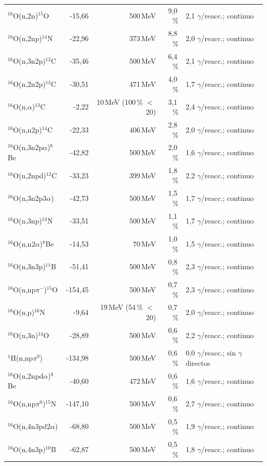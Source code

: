 \documentclass[11pt,a4paper]{article}
\begin{document}
{\begin{longtable}{p{4.4cm}rrrp{4.6cm}}
$^{16}$O(n,2n)$^{15}$O & -15,66 & 500\,MeV & 9,0\,\% & 2,1 $\gamma$/reacc.; continuo \\
$^{16}$O(n,2np)$^{14}$N & -22,96 & 373\,MeV & 8,8\,\% & 2,0 $\gamma$/reacc.; continuo \\
$^{16}$O(n,3n2p)$^{12}$C & -35,46 & 500\,MeV & 6,4\,\% & 2,1 $\gamma$/reacc.; continuo \\
$^{16}$O(n,2n2p)$^{13}$C & -30,51 & 471\,MeV & 4,0\,\% & 1,7 $\gamma$/reacc.; continuo \\
$^{16}$O(n,$\alpha$)$^{13}$C & -2,22 & 10\,MeV (100\,\% $<$\,20) & 3,1\,\% & 2,4 $\gamma$/reacc.; continuo \\
$^{16}$O(n,n2p)$^{14}$C & -22,33 & 406\,MeV & 2,8\,\% & 2,0 $\gamma$/reacc.; continuo \\
$^{16}$O(n,3n2p$\alpha$)$^{8}$Be & -42,82 & 500\,MeV & 2,0\,\% & 1,6 $\gamma$/reacc.; continuo \\
$^{16}$O(n,2npd)$^{12}$C & -33,23 & 399\,MeV & 1,8\,\% & 2,2 $\gamma$/reacc.; continuo \\
$^{16}$O(n,3n2p3$\alpha$) & -42,73 & 500\,MeV & 1,5\,\% & 1,7 $\gamma$/reacc.; continuo \\
$^{16}$O(n,3np)$^{13}$N & -33,51 & 500\,MeV & 1,1\,\% & 1,7 $\gamma$/reacc.; continuo \\
$^{16}$O(n,n2$\alpha$)$^{8}$Be & -14,53 & 70\,MeV & 1,0\,\% & 1,5 $\gamma$/reacc.; continuo \\
$^{16}$O(n,3n3p)$^{11}$B & -51,41 & 500\,MeV & 0,8\,\% & 2,3 $\gamma$/reacc.; continuo \\
$^{16}$O(n,np$\pi^-$)$^{15}$O & -154,45 & 500\,MeV & 0,7\,\% & 2,3 $\gamma$/reacc.; continuo \\
$^{16}$O(n,p)$^{16}$N & -9,64 & 19\,MeV (54\,\% $<$\,20) & 0,7\,\% & 2,0 $\gamma$/reacc.; continuo \\
$^{16}$O(n,3n)$^{14}$O & -28,89 & 500\,MeV & 0,6\,\% & 2,2 $\gamma$/reacc.; continuo \\
$^{1}$H(n,np$\pi^0$) & -134,98 & 500\,MeV & 0,6\,\% & 0,0 $\gamma$/reacc.; sin $\gamma$ directos \\
$^{16}$O(n,2npd$\alpha$)$^{8}$Be & -40,60 & 472\,MeV & 0,6\,\% & 1,6 $\gamma$/reacc.; continuo \\
$^{16}$O(n,np$\pi^0$)$^{15}$N & -147,10 & 500\,MeV & 0,6\,\% & 2,7 $\gamma$/reacc.; continuo \\
$^{16}$O(n,4n3pd2$\alpha$) & -68,80 & 500\,MeV & 0,5\,\% & 1,9 $\gamma$/reacc.; continuo \\
$^{16}$O(n,4n3p)$^{10}$B & -62,87 & 500\,MeV & 0,5\,\% & 1,8 $\gamma$/reacc.; continuo \\

\end{longtable}}
\end{document}
